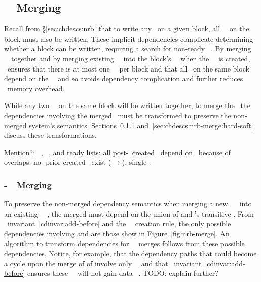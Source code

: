\subsection{\Nrb\ \ChDesc\ Merging}
\label{sec:chdescs:nrb-merge}
Recall from \S\ref{sec:chdescs:nrb} that to write any \chdesc\ on a given
block, all \nrb\ \chdescs\ on the block must also be written. 
%
These implicit dependencies complicate determining whether a block can
be written, requiring a search for non-ready \nrb\ \chdescs.
%
By merging \nrb\ \chdescs\ together and by merging existing \rb\
\chdescs\ into the block's \nrb\ \chdesc\ when the \nrb\ \chdesc\ is
created,
%
\Kudos\ ensures that there is at most one \nrb\ \chdesc\ per block and
that all \chdescs\ on the same block depend on the \nrb\
\chdesc\,
%
and so avoids dependency complication and further reduces \chdesc\
memory overhead.

While any two \nrb\ \chdescs\ on the same block will be written
together, to merge the \chdescs\ the dependencies involving the merged
\chdescs\ must be transformed to preserve the non-merged system's
semantics.  Sections~\ref{sec:chdescs:nrb-merge:hard-hard}
and~\ref{sec:chdescs:nrb-merge:hard-soft} discuss these
transformations.

Mention?:
%
\Nrb\ \chdescs, \rb\ \chdescs, and ready lists:
%
all post-\nrb\ created \chdescs\ depend on \nrb\ because of overlaps.
%
no \nrb-prior created \chdescs\ exist (\rb{}\(\rightarrow\)\nrb{}).
%
single \nrb.

\subsubsection{\Nrb-\Nrb\ \ChDesc\ Merging}
\label{sec:chdescs:nrb-merge:hard-hard}
To preserve the non-merged dependency semantics when merging a new
\nrb\ \chdesc\  into an existing \nrb\ \chdesc\ \p{p}, the merged
\p{(p+q)} must depend on the union of \p{p} and 's transitive
\befores.
%
From \chdesc\ invariant~\ref{cdinvar:add-before} and the \nrb\
\chdesc\ creation rule, the only possible dependencies involving 
and \p{q} are those show in Figure~\ref{fig:nrb-merge}.
%
An algorithm to transform dependencies for \nrb\ \chdesc\ merges
follows from these possible dependencies.
%
Notice, for example, that the dependency paths that could become a
cycle upon the merge of \p{p} of \p{q} involve only \noop\ \chdescs\
and that \chdesc\ invariant~\ref{cdinvar:add-before} ensures these
\noop\ \chdesc\ will not gain data \chdesc\ \befores.
%
TODO: explain further?

